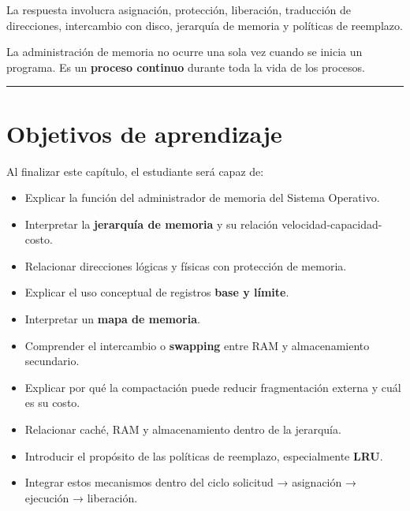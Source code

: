 \documentclass[
  spanish,
  letterpaper,
]{scrbook}
\providecommand{\tightlist}{%
  \setlength{\itemsep}{0pt}\setlength{\parskip}{0pt}}
\begin{document}
La respuesta involucra asignación, protección, liberación, traducción de
direcciones, intercambio con disco, jerarquía de memoria y políticas de
reemplazo.

\begin{tcolorbox}[enhanced jigsaw, arc=.35mm, bottomrule=.15mm, bottomtitle=1mm, breakable, colback=white, colbacktitle=quarto-callout-tip-color!10!white, colframe=quarto-callout-tip-color-frame, coltitle=black, left=2mm, leftrule=.75mm, opacityback=0, opacitybacktitle=0.6, rightrule=.15mm, title=\textcolor{quarto-callout-tip-color}{\faLightbulb}\hspace{0.5em}{Idea central}, titlerule=0mm, toprule=.15mm, toptitle=1mm]

La administración de memoria no ocurre una sola vez cuando se inicia un
programa. Es un \textbf{proceso continuo} durante toda la vida de los
procesos.

\end{tcolorbox}

\begin{center}\rule{0.5\linewidth}{0.5pt}\end{center}


\chapter{Objetivos de aprendizaje}\label{objetivos-de-aprendizaje-10}

Al finalizar este capítulo, el estudiante será capaz de:

\begin{itemize}
\tightlist
\item
  Explicar la función del administrador de memoria del Sistema
  Operativo.
\item
  Interpretar la \textbf{jerarquía de memoria} y su relación
  velocidad-capacidad-costo.
\item
  Relacionar direcciones lógicas y físicas con protección de memoria.
\item
  Explicar el uso conceptual de registros \textbf{base y límite}.
\item
  Interpretar un \textbf{mapa de memoria}.
\item
  Comprender el intercambio o \textbf{swapping} entre RAM y
  almacenamiento secundario.
\item
  Explicar por qué la compactación puede reducir fragmentación externa y
  cuál es su costo.
\item
  Relacionar caché, RAM y almacenamiento dentro de la jerarquía.
\item
  Introducir el propósito de las políticas de reemplazo, especialmente
  \textbf{LRU}.
\item
  Integrar estos mecanismos dentro del ciclo solicitud → asignación →
  ejecución → liberación.
\end{itemize}
\end{document}
